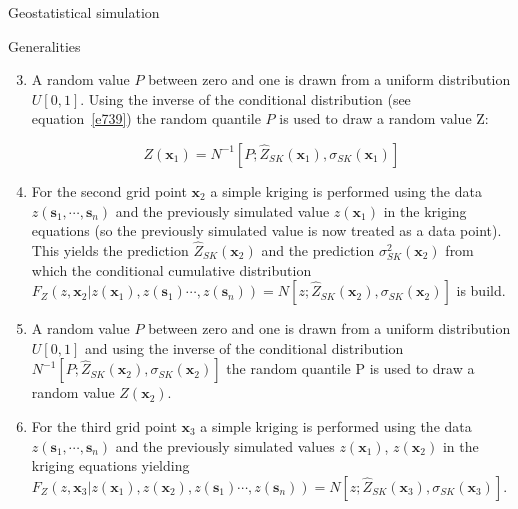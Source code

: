 \documentclass[8pt]{beamer}
\renewcommand{\emph}[1]{\textcolor{myorange}{#1}}
\begin{document}
  \begin{frame}{Geostatistical simulation}
     \begin{block}{Generalities}
    \end{block}
\begin{enumerate}
    \setcounter{enumi}{2} %
    \item A random value $P$ between zero and one is drawn from a \emph{uniform distribution} $U[0,1]$. Using the \emph{inverse of the conditional distribution} (see equation~\ref{e739}) the \emph{random quantile} $P$ is used to draw a \emph{random value Z}:

            \begin{equation}
                Z(\mathbf{x}_1) = N^{-1} \left[P;\hat{Z}_{SK}(\mathbf{x}_1), \sigma_{SK}(\mathbf{x}_1) \right]
                \label{e740}
            \end{equation}
        \item For the second grid point $\mathbf{x}_2$ a \emph{simple kriging} is performed using the data $z(\mathbf{s}_1, \cdots, \mathbf{s}_n)$ and the previously simulated value $z(\mathbf{x}_1)$ in the \emph{kriging equations} (so the previously simulated value is now treated as a data point). This yields the prediction $\hat{Z}_{SK}(\mathbf{x}_2)$ and the prediction $\sigma_{SK}^2(\mathbf{x}_2)$ from which the \emph{conditional cumulative distribution} $F_Z(z,\mathbf{x}_2 | z(\mathbf{x}_1),z(\mathbf{s}_1) \cdots, z(\mathbf{s}_n)) = N\left[z;\hat{Z}_{SK}(\mathbf{x}_2), \sigma_{SK}(\mathbf{x}_2) \right]$ is build. 
        \item A random value $P$ between zero and one is drawn from a \emph{uniform distribution} $U[0,1]$ and using the \emph{inverse of the conditional distribution} $N^{-1} \left[P;\hat{Z}_{SK}(\mathbf{x}_2), \sigma_{SK}(\mathbf{x}_2) \right]$ the \emph{random quantile P} is used to draw a random value $Z(\mathbf{x}_2)$.
        \item For the third grid point $\mathbf{x}_3$ a \emph{simple kriging} is performed using the data  $z(\mathbf{s}_1, \cdots, \mathbf{s}_n)$ and the previously simulated values $z(\mathbf{x}_1)$, $z(\mathbf{x}_2)$ in the \emph{kriging equations} yielding $F_Z(z,\mathbf{x}_3 | z(\mathbf{x}_1),z(\mathbf{x}_2), z(\mathbf{s}_1) \cdots, z(\mathbf{s}_n)) = N\left[z;\hat{Z}_{SK}(\mathbf{x}_3), \sigma_{SK}(\mathbf{x}_3) \right]$.
\end{enumerate}
\end{frame}
\end{document}
